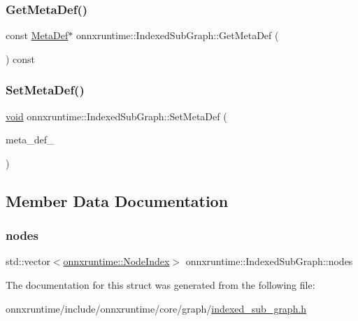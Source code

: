 \subsubsection{\texorpdfstring{Get\+Meta\+Def()}{GetMetaDef()}}
{\footnotesize\ttfamily const \mbox{\hyperlink{structonnxruntime_1_1IndexedSubGraph_1_1MetaDef}{Meta\+Def}}$\ast$ onnxruntime\+::\+Indexed\+Sub\+Graph\+::\+Get\+Meta\+Def (\begin{DoxyParamCaption}{ }\end{DoxyParamCaption}) const\hspace{0.3cm}{\ttfamily [inline]}}

\mbox{\label{structonnxruntime_1_1IndexedSubGraph_a25334eec39bc19a5f70d71c939f38ebf}} 
\subsubsection{\texorpdfstring{Set\+Meta\+Def()}{SetMetaDef()}}
{\footnotesize\ttfamily \mbox{\hyperlink{mlasi_8h_a88f941d423cb2a819b70a1358982b1a6}{void}} onnxruntime\+::\+Indexed\+Sub\+Graph\+::\+Set\+Meta\+Def (\begin{DoxyParamCaption}\item[{std\+::unique\+\_\+ptr$<$ \mbox{\hyperlink{structonnxruntime_1_1IndexedSubGraph_1_1MetaDef}{Meta\+Def}} $>$ \&}]{meta\+\_\+def\+\_\+ }\end{DoxyParamCaption})\hspace{0.3cm}{\ttfamily [inline]}}



\subsection{Member Data Documentation}
\mbox{\label{structonnxruntime_1_1IndexedSubGraph_aa3c149071e4eaf87884df02ae5da7374}} 
\subsubsection{\texorpdfstring{nodes}{nodes}}
{\footnotesize\ttfamily std\+::vector$<$\mbox{\hyperlink{namespaceonnxruntime_af8773b5c12b5d8fd9292eb2e268df760}{onnxruntime\+::\+Node\+Index}}$>$ onnxruntime\+::\+Indexed\+Sub\+Graph\+::nodes}



The documentation for this struct was generated from the following file\+:\begin{DoxyCompactItemize}
\item 
onnxruntime/include/onnxruntime/core/graph/\mbox{\hyperlink{indexed__sub__graph_8h}{indexed\+\_\+sub\+\_\+graph.\+h}}\end{DoxyCompactItemize}
